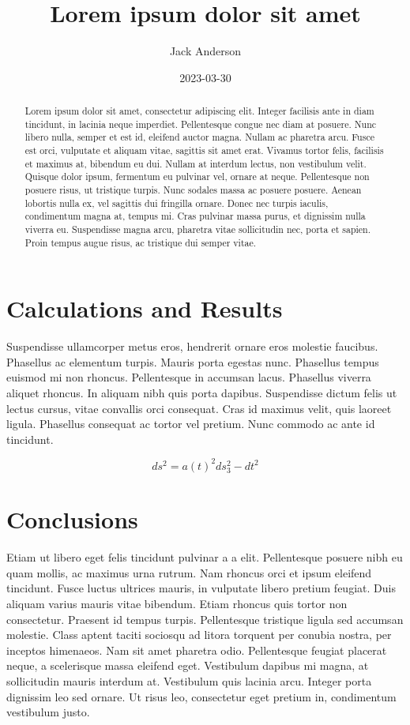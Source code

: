 \documentclass{uestcphyrpt}
\title{Lorem ipsum dolor sit amet}
\author{Jack Anderson}
\date{2023-03-30}
\begin{document}
\maketitle

\begin{abstract}

Lorem ipsum dolor sit amet, consectetur adipiscing elit. Integer facilisis ante in diam tincidunt, in lacinia neque imperdiet. Pellentesque congue nec diam at posuere. Nunc libero nulla, semper et est id, eleifend auctor magna. Nullam ac pharetra arcu. Fusce est orci, vulputate et aliquam vitae, sagittis sit amet erat. Vivamus tortor felis, facilisis et maximus at, bibendum eu dui. Nullam at interdum lectus, non vestibulum velit. Quisque dolor ipsum, fermentum eu pulvinar vel, ornare at neque. Pellentesque non posuere risus, ut tristique turpis. Nunc sodales massa ac posuere posuere. Aenean lobortis nulla ex, vel sagittis dui fringilla ornare. Donec nec turpis iaculis, condimentum magna at, tempus mi. Cras pulvinar massa purus, et dignissim nulla viverra eu. Suspendisse magna arcu, pharetra vitae sollicitudin nec, porta et sapien. Proin tempus augue risus, ac tristique dui semper vitae.

\end{abstract}

\section{Calculations and Results}

Suspendisse ullamcorper metus eros, hendrerit ornare eros molestie faucibus. Phasellus ac elementum turpis. Mauris porta egestas nunc. Phasellus tempus euismod mi non rhoncus. Pellentesque in accumsan lacus. Phasellus viverra aliquet rhoncus. In aliquam nibh quis porta dapibus. Suspendisse dictum felis ut lectus cursus, vitae convallis orci consequat. Cras id maximus velit, quis laoreet ligula. Phasellus consequat ac tortor vel pretium. Nunc commodo ac ante id tincidunt.

\[ ds^2=a(t)^2ds_3^2-dt^2 \]

\section{Conclusions}

Etiam ut libero eget felis tincidunt pulvinar a a elit. Pellentesque posuere nibh eu quam mollis, ac maximus urna rutrum. Nam rhoncus orci et ipsum eleifend tincidunt. Fusce luctus ultrices mauris, in vulputate libero pretium feugiat. Duis aliquam varius mauris vitae bibendum. Etiam rhoncus quis tortor non consectetur. Praesent id tempus turpis. Pellentesque tristique ligula sed accumsan molestie. Class aptent taciti sociosqu ad litora torquent per conubia nostra, per inceptos himenaeos. Nam sit amet pharetra odio. Pellentesque feugiat placerat neque, a scelerisque massa eleifend eget. Vestibulum dapibus mi magna, at sollicitudin mauris interdum at. Vestibulum quis lacinia arcu. Integer porta dignissim leo sed ornare. Ut risus leo, consectetur eget pretium in, condimentum vestibulum justo.
\end{document}
